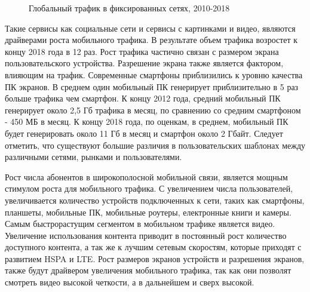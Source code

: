 \begin{figure} [!h]
  \center
  \caption{Глобальный трафик в фиксированных сетях, 2010-2018 \cite{ericsson}}
  \label{img1:mob6}
\end{figure}


Такие сервисы как социальные сети и сервисы с картинками и видео, являются драйверами роста мобильного трафика. В результате объем трафика возростет к концу 2018 года в 12 раз. Рост трафика частично связан с размером экрана пользовательского устройства. Разрешение экрана также является фактором, влияющим на трафик. Современные смартфоны приблизились к уровню качества ПК экранов. В среднем один мобильный ПК генерирует приблизительно в 5 раз больше трафика чем смартфон. К концу 2012 года, средний мобильный ПК генерирует около 2,5 Гб трафика в месяц, по сравнению со средним смартфоном - 450 МБ в месяц. К концу 2018 года, по оценкам, в среднем, мобильный ПК будет генерировать около 11 Гб в месяц и смартфон около 2 Гбайт. Следует отметить, что существуют большие различия в пользовательских шаблонах между различными сетями, рынками и пользователями.

Рост числа абонентов в широкополосной мобильной связи, является мощным стимулом роста для мобильного трафика. С увеличением числа пользователей, увеличивается количество устройств подключенных к сети, таких как смартфоны, планшеты, мобильные ПК, мобильные роутеры, електронные книги и камеры.  Самым быстрорастущим сегментом в мобильном трафике является видео. Увеличение использования контента приводит в постоянный рост количество доступного контента, а так же к лучшим сетевым скоростям, которые приходят с развитием HSPA и LTE. Рост размеров экранов устройств и разрешения экранов, также будут драйвером увеличения мобильного трафика, так как они позволят смотреть видео высокой четкости, а в дальнейшем и сверх высокой. 


